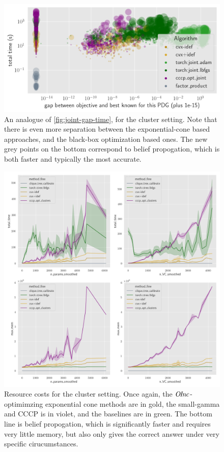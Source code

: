 \begin{subappendices}
\begin{figure}
    \centering
    \includegraphics[width=0.67\linewidth]{figs/rand-clus/gap-vs-time}
    \caption{An analogue of \cref{fig:joint-gap-time}, for the cluster setting.
    Note that there is even more separation between the exponential-cone based approaches, and the black-box optimization based ones.
    The new grey points on the bottom correspond to belief propogation, which is both faster and typically the most accurate.}
    \label{fig:clus-gap-vs-time--appendix}
\end{figure}
\begin{figure}
    \centering
    \includegraphics[width=0.67\linewidth]{figs/rand-clus/resource-costs}
    \caption{Resource costs for the cluster setting. Once again, the $\mathit{O\mskip-2.5muI\mskip-3.5mun\mskip-1.7muc}$-optimimzing exponential cone methods are in gold, the small-gamma and CCCP is in violet, and the baselines are in green. The bottom line is belief propogation, which is significantly faster and requires very little memory, but also only gives the correct answer under very specific cirucumstances.}
    \label{fig:clus-resource-costs}
\end{figure}



\end{subappendices}
